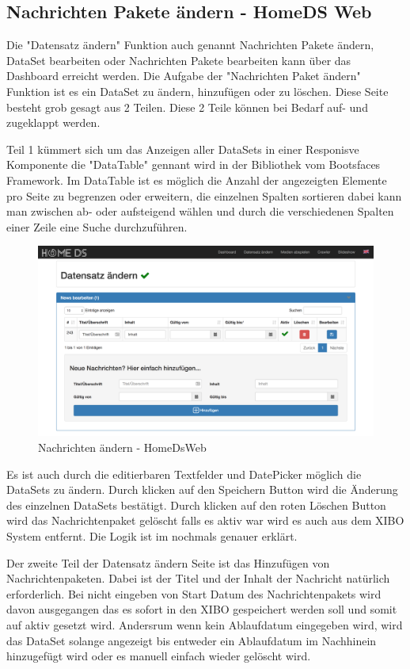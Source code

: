 \subsection{Nachrichten Pakete ändern - HomeDS Web}\label{sec:homedswebdataset}
Die "Datensatz ändern" Funktion auch genannt Nachrichten Pakete ändern, DataSet bearbeiten oder Nachrichten Pakete bearbeiten kann über das Dashboard erreicht werden.
Die Aufgabe der "Nachrichten Paket ändern" Funktion ist es ein DataSet zu ändern, hinzufügen oder zu löschen. Diese Seite besteht grob gesagt aus 2 Teilen. Diese 2 Teile können bei Bedarf auf- und zugeklappt werden.

Teil 1 kümmert sich um das Anzeigen aller DataSets in einer Responisve Komponente die "DataTable" gennant wird in der Bibliothek vom Bootsfaces Framework. Im DataTable ist es möglich die Anzahl der angezeigten Elemente pro Seite zu begrenzen oder erweitern,  die einzelnen Spalten sortieren dabei kann man zwischen ab- oder aufsteigend wählen und durch die verschiedenen Spalten einer Zeile eine Suche durchzuführen. 


\begin{figure}[H]
\centering
\includegraphics[width=1\textwidth]{images/08_HomeDsWeb/NachrichtenPaket.png}
\caption{Nachrichten ändern - HomeDsWeb}
\label{img:changenews}
\end{figure}


Es ist auch durch die editierbaren Textfelder und DatePicker möglich die DataSets zu ändern. Durch klicken auf den Speichern Button wird die Änderung des einzelnen DataSets bestätigt. Durch klicken auf den roten Löschen Button wird das Nachrichtenpaket gelöscht falls es aktiv war wird es auch aus dem XIBO System entfernt. Die Logik ist im \pageref{sec:datasetexpiredate} nochmals genauer erklärt. 

Der zweite Teil der Datensatz ändern Seite ist das Hinzufügen von Nachrichtenpaketen. Dabei ist der Titel und der Inhalt der Nachricht natürlich erforderlich. Bei nicht eingeben von Start Datum des Nachrichtenpakets wird davon ausgegangen das es sofort in den XIBO gespeichert werden soll und somit auf aktiv gesetzt wird. Andersrum wenn kein Ablaufdatum eingegeben wird, wird das DataSet solange angezeigt bis entweder ein Ablaufdatum im Nachhinein hinzugefügt wird oder es manuell einfach wieder gelöscht wird.

